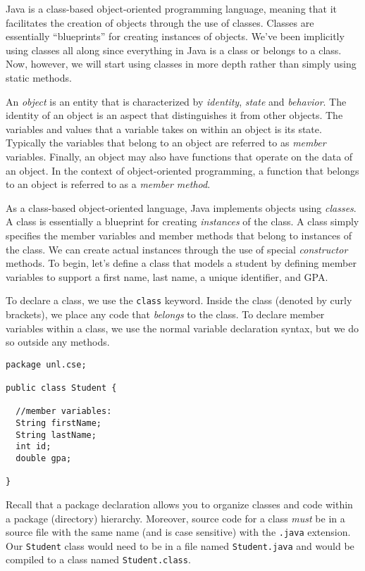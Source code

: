 

Java is a class-based object-oriented programming language, meaning
that it facilitates the creation of objects through the use of classes.
Classes are essentially ``blueprints'' for creating instances of 
objects.  We've been implicitly using classes all along since everything
in Java is a class or belongs to a class.  Now, however, we will
start using classes in more depth rather than simply using static 
methods.

An \emph{object} is an entity that is characterized by \emph{identity}, 
\emph{state} and \emph{behavior}.  The identity of an object is an
aspect that distinguishes it from other objects.  The variables and
values that a variable takes on within an object is its state.  Typically
the variables that belong to an object are referred to as \emph{member} 
variables.  Finally, an object may also have functions that operate
on the data of an object.  In the context of object-oriented programming, 
a function that belongs to an object is referred to as a 
\emph{member method}.

As a class-based object-oriented language, Java implements objects
using \emph{classes}.  A class is essentially a blueprint for creating
\emph{instances} of the class.  A class simply specifies the
member variables and member methods that belong to instances of the
class.  We can create actual instances through the use of special
\emph{constructor} methods. To begin, let's define a class that 
models a student by
defining member variables to support a first name, last name, a
unique identifier, and GPA.

To declare a class, we use the \texttt{class} keyword.
Inside the class (denoted by curly brackets), we place any code that
\emph{belongs} to the class.  To declare member variables within
a class, we use the normal variable declaration syntax, but we
do so outside any methods.

\begin{verbatim}
package unl.cse;

public class Student {

  //member variables:
  String firstName;
  String lastName;
  int id;
  double gpa;

}
\end{verbatim}

Recall that a package declaration allows you to organize classes and
code within a package (directory) hierarchy.  Moreover, source code
for a class \emph{must} be in a source file with the same name 
(and is case sensitive) with the \texttt{.java} extension.
Our \texttt{Student} class would need to be in a file named
\texttt{Student.java} and would be compiled to a class named
\texttt{Student.class}.  

